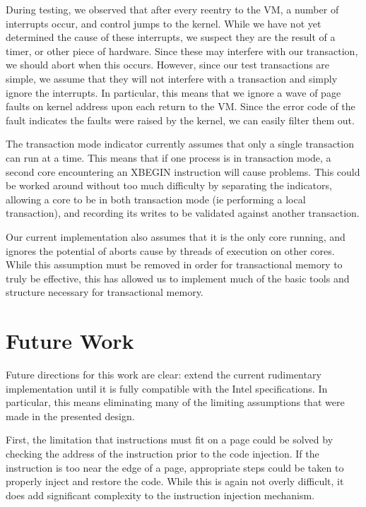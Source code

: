 \documentclass{acm_proc_article-sp}
\begin{document}
During testing, we observed that after every reentry to the VM, a number
of interrupts occur, and control jumps to the kernel. While we have not yet
determined the cause of these interrupts, we suspect they are the result of 
a timer, or other piece of hardware. Since these may interfere with our 
transaction, we should abort when this occurs. However, since our test 
transactions are simple, we assume that they will not interfere with a 
transaction and simply ignore the interrupts. In particular, this means that
we ignore a wave of page faults on kernel address upon each return to the
VM. Since the error code of the fault indicates the faults were raised by
the kernel, we can easily filter them out.   

The transaction mode indicator currently assumes that only a single
transaction can run at a time. This means that if one process is in transaction
mode, a second core encountering an XBEGIN instruction will cause problems.
This could be worked around without too much difficulty by separating the
indicators, allowing a core to be in both transaction mode (ie performing
a local transaction), and recording its writes to be validated against
another transaction.

Our current implementation also assumes that it is the only core running, and
ignores the potential of aborts cause by threads of execution on other cores.
While this assumption must be removed in order for transactional memory to
truly be effective, this has allowed us to implement much of the basic tools
and structure necessary for transactional memory.
 

\section{Future Work}

Future directions for this work are clear: extend the current rudimentary 
implementation until it is fully compatible with the Intel specifications. In
particular, this means eliminating many of the limiting assumptions that were
made in the presented design.

First, the limitation that instructions must fit on a page could be solved by
checking the address of the instruction prior to the code injection. If the 
instruction is too near the edge of a page, appropriate steps could be taken
to properly inject and restore the code. While this is again not overly 
difficult, it does add significant complexity to the instruction injection
mechanism.
\end{document}
